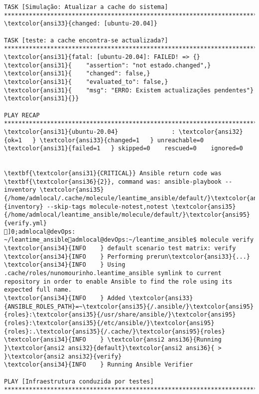 \documentclass{scrartcl}
\begin{document}
\begin{Verbatim}
TASK [Simulação: Atualizar a cache do sistema] *******************************************************************************************
\textcolor{ansi33}{changed: [ubuntu-20.04]}

TASK [teste: a cache encontra-se actualizada?] *******************************************************************************************
\textcolor{ansi31}{fatal: [ubuntu-20.04]: FAILED! => {}
\textcolor{ansi31}{    "assertion": "not estado.changed",}
\textcolor{ansi31}{    "changed": false,}
\textcolor{ansi31}{    "evaluated_to": false,}
\textcolor{ansi31}{    "msg": "ERRO: Existem actualizações pendentes"}
\textcolor{ansi31}{}}

PLAY RECAP *******************************************************************************************************************************
\textcolor{ansi31}{ubuntu-20.04}               : \textcolor{ansi32}{ok=1   } \textcolor{ansi33}{changed=1   } unreachable=0    \textcolor{ansi31}{failed=1   } skipped=0    rescued=0    ignored=0


\textbf{\textcolor{ansi31}{CRITICAL}} Ansible return code was \textbf{\textcolor{ansi36}{2}}, command was: ansible-playbook --inventory \textcolor{ansi35}{/home/admlocal/.cache/molecule/leantime_ansible/default/}\textcolor{ansi95}{inventory} --skip-tags molecule-notest,notest \textcolor{ansi35}{/home/admlocal/leantime_ansible/molecule/default/}\textcolor{ansi95}{verify.yml}
]0;admlocal@devOps: ~/leantime_ansibleadmlocal@devOps:~/leantime_ansible$ molecule verify
\textcolor{ansi34}{INFO    } default scenario test matrix: verify
\textcolor{ansi34}{INFO    } Performing prerun\textcolor{ansi33}{...}
\textcolor{ansi34}{INFO    } Using .cache/roles/nunomourinho.leantime_ansible symlink to current repository in order to enable Ansible to find the role using its expected full name.
\textcolor{ansi34}{INFO    } Added \textcolor{ansi33}{ANSIBLE_ROLES_PATH}=~\textcolor{ansi35}{/.ansible/}\textcolor{ansi95}{roles}:\textcolor{ansi35}{/usr/share/ansible/}\textcolor{ansi95}{roles}:\textcolor{ansi35}{/etc/ansible/}\textcolor{ansi95}{roles}:.\textcolor{ansi35}{/.cache/}\textcolor{ansi95}{roles}
\textcolor{ansi34}{INFO    } \textcolor{ansi2 ansi36}{Running }\textcolor{ansi2 ansi32}{default}\textcolor{ansi2 ansi36}{ > }\textcolor{ansi2 ansi32}{verify}
\textcolor{ansi34}{INFO    } Running Ansible Verifier

PLAY [Infraestrutura conduzida por testes] ***********************************************************************************************


\end{Verbatim}
\end{document}
